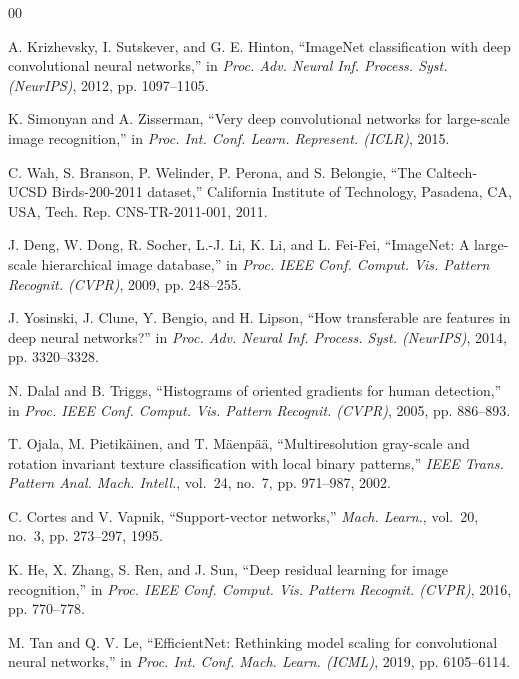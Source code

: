 \documentclass[conference]{IEEEtran}
\begin{document}
\begin{thebibliography}{00}

 A. Krizhevsky, I. Sutskever, and G. E. Hinton,
``ImageNet classification with deep convolutional neural networks,'' in
\emph{Proc. Adv. Neural Inf. Process. Syst. (NeurIPS)}, 2012, pp. 1097--1105.

 K. Simonyan and A. Zisserman, ``Very deep convolutional
networks for large-scale image recognition,'' in \emph{Proc. Int. Conf. Learn.
Represent. (ICLR)}, 2015.

 C. Wah, S. Branson, P. Welinder, P. Perona, and S. Belongie,
``The Caltech-UCSD Birds-200-2011 dataset,'' California Institute of Technology,
Pasadena, CA, USA, Tech. Rep. CNS-TR-2011-001, 2011.

 J. Deng, W. Dong, R. Socher, L.-J. Li, K. Li, and L. Fei-Fei,
``ImageNet: A large-scale hierarchical image database,'' in \emph{Proc. IEEE Conf.
Comput. Vis. Pattern Recognit. (CVPR)}, 2009, pp. 248--255.

 J. Yosinski, J. Clune, Y. Bengio, and H. Lipson, ``How
transferable are features in deep neural networks?'' in \emph{Proc. Adv. Neural
Inf. Process. Syst. (NeurIPS)}, 2014, pp. 3320--3328.

 N. Dalal and B. Triggs, ``Histograms of oriented gradients for
human detection,'' in \emph{Proc. IEEE Conf. Comput. Vis. Pattern Recognit.
(CVPR)}, 2005, pp. 886--893.

 T. Ojala, M. Pietik\"ainen, and T. M\"aenp\"a\"a,
``Multiresolution gray-scale and rotation invariant texture classification with
local binary patterns,'' \emph{IEEE Trans. Pattern Anal. Mach. Intell.}, vol.~24,
no.~7, pp. 971--987, 2002.

 C. Cortes and V. Vapnik, ``Support-vector networks,''
\emph{Mach. Learn.}, vol.~20, no.~3, pp. 273--297, 1995.

 K. He, X. Zhang, S. Ren, and J. Sun, ``Deep residual learning for
image recognition,'' in \emph{Proc. IEEE Conf. Comput. Vis. Pattern Recognit.
(CVPR)}, 2016, pp. 770--778.

 M. Tan and Q. V. Le, ``EfficientNet: Rethinking model scaling for
convolutional neural networks,'' in \emph{Proc. Int. Conf. Mach. Learn. (ICML)},
2019, pp. 6105--6114.


\end{thebibliography}
\end{document}
